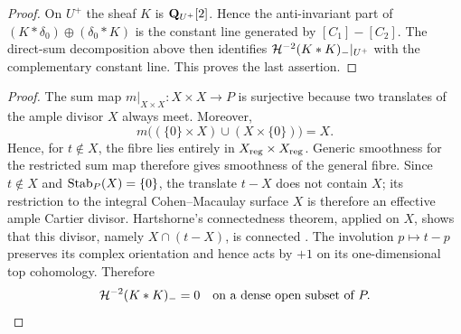 \begin{proof}
On $U^+$ the sheaf $K$ is $\mathbf Q_{U^+}[2]$.  Hence the anti-invariant part of
$(K*\delta_0)\oplus(\delta_0*K)$ is the constant line generated by
$[C_1]-[C_2]$.  The direct-sum decomposition above then identifies
$\mathcal H^{-2}(K*K)_-|_{U^+}$ with the complementary constant line.  This proves
the last assertion.
\end{proof}


\begin{proof}
The sum map $m|_{X\times X}:X\times X\to P$ is surjective because two
translates of the ample divisor $X$ always meet.  Moreover,
\[
 m\bigl((\{0\}\times X)\cup(X\times\{0\})\bigr)=X.
\]
Hence, for $t\notin X$, the fibre lies entirely in
$X_{\mathrm{reg}}\times X_{\mathrm{reg}}$.  Generic smoothness for the restricted sum map
therefore gives smoothness of the general fibre.  Since $t\notin X$ and
$\operatorname{Stab}_P(X)=\{0\}$, the translate $t-X$ does not contain $X$; its restriction
to the integral Cohen--Macaulay surface $X$ is therefore an effective ample
Cartier divisor.  Hartshorne's connectedness theorem, applied on $X$, shows
that this divisor, namely $X\cap(t-X)$, is connected
\cite[Corollary~III.7.9]{Hartshorne1977}.
The involution $p\mapsto t-p$ preserves its complex orientation and hence
acts by $+1$ on its one-dimensional top cohomology.  Therefore
\begin{equation}
 \mathcal H^{-2}(K*K)_-=0
 \quad\text{on a dense open subset of }P.
\label{eq:generic-alt-vanishing}
\end{equation}
\end{proof}
